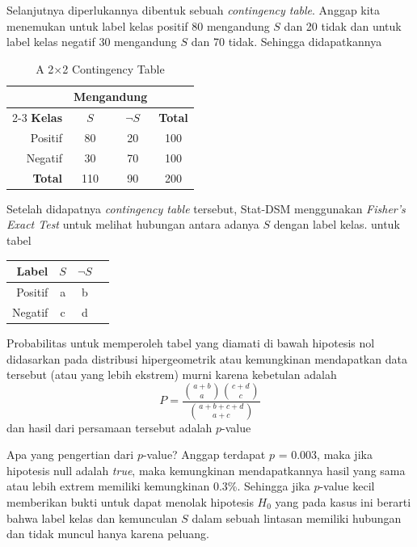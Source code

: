 \documentclass[a4paper,twoside]{article}
\begin{document}
Selanjutnya diperlukannya dibentuk sebuah \textit{contingency table}.
Anggap kita menemukan untuk label kelas positif 80 mengandung $S$ dan 20 tidak dan untuk label kelas negatif 30 mengandung $S$ dan 70 tidak.
Sehingga didapatkannya 
\begin{table}[ht]
	\centering
	\caption{A 2$\times$2 Contingency Table}
	\label{tab:contingency_example}
	\begin{tabular}{rccc}
		\toprule
		& \multicolumn{2}{c}{\textbf{Mengandung}} & \\
		\cmidrule(lr){2-3}
		\textbf{Kelas} & $S$ & $\neg S$ & \textbf{Total} \\
		\midrule
		Positif & 80 & 20 & 100 \\
		Negatif & 30 & 70 & 100 \\
		\midrule
		\textbf{Total} & 110 & 90 & 200 \\
		\bottomrule
	\end{tabular}
\end{table}

Setelah didapatnya \textit{contingency table} tersebut, Stat-DSM menggunakan \textit{Fisher's Exact Test} untuk melihat hubungan antara adanya $S$ dengan label kelas.
untuk tabel 
\begin{table}[ht]
	\centering
	\begin{tabular}{rccc}
		\textbf{Label} & $S$ & $\neg S$ \\
		\midrule
		Positif & a & b \\
		Negatif & c & d \\
	\end{tabular}
\end{table}

Probabilitas untuk memperoleh tabel yang diamati di bawah hipotesis nol didasarkan pada distribusi hipergeometrik atau kemungkinan mendapatkan data tersebut (atau yang lebih ekstrem) murni karena kebetulan adalah \[ P = \frac{\binom{a+b}{a}\binom{c+d}{c}}{\binom{a+b+c+d}{a+c}} \]
dan hasil dari persamaan tersebut adalah $p$-value

Apa yang pengertian dari $p$-value?
Anggap terdapat $p$ = 0.003, maka jika hipotesis null adalah \textit{true}, maka kemungkinan mendapatkannya hasil yang sama atau lebih extrem memiliki kemungkinan 0.3\%.
Sehingga jika $p$-value kecil memberikan bukti untuk dapat menolak hipotesis $H_0$ yang pada kasus ini berarti bahwa label kelas dan kemunculan $S$ dalam sebuah lintasan memiliki hubungan dan tidak muncul hanya karena peluang.
\end{document}
